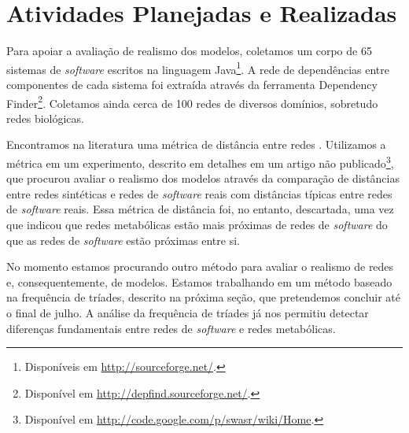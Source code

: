 \documentclass[12pt]{article}
\begin{document}
\section{Atividades Planejadas e Realizadas}


Para apoiar a avaliação de realismo dos modelos, coletamos um corpo de 65
sistemas de \emph{software} escritos na linguagem Java\footnote{Disponíveis em
\url{http://sourceforge.net/}.}. A rede de dependências entre componentes de
cada sistema foi extraída através da ferramenta Dependency
Finder\footnote{Disponível em \url{http://depfind.sourceforge.net/}.}.
Coletamos ainda cerca de 100 redes de diversos domínios, sobretudo redes
biológicas. %

Encontramos na literatura uma métrica de distância entre redes
\cite{Andrade2008}.  Utilizamos a métrica em um experimento, descrito em
detalhes em um artigo não publicado\footnote{Disponível em
\url{http://code.google.com/p/swasr/wiki/Home}.}, que procurou avaliar o
realismo dos modelos através da comparação de distâncias entre redes sintéticas e
redes de \emph{software} reais com distâncias típicas entre redes de
\emph{software} reais. Essa métrica de distância foi, no entanto, descartada,
uma vez que indicou que redes metabólicas \cite{Jeong2000} estão mais próximas
de redes de \emph{software} do que as redes de \emph{software} estão próximas
entre si.

No momento estamos procurando outro método para avaliar o realismo de redes e,
consequentemente, de modelos. 
Estamos trabalhando em um método baseado na frequência de tríades, descrito na
próxima seção, que pretendemos concluir até o final de julho. A análise da
frequência de tríades já nos permitiu detectar diferenças fundamentais entre
redes de \emph{software} e redes metabólicas. 
\end{document}
